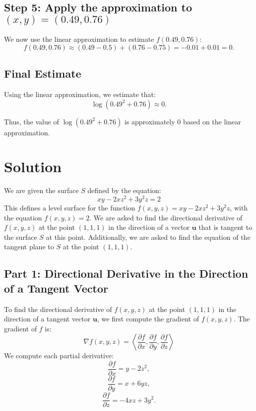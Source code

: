 \documentclass[11pt]{article}
\begin{document}
\newpage

\subsection{Step 5: Apply the approximation to \( (x, y) = (0.49, 0.76) \)}

We now use the linear approximation to estimate \( f(0.49, 0.76) \):
\[
f(0.49, 0.76) \approx (0.49 - 0.5) + (0.76 - 0.75) = -0.01 + 0.01 = 0.
\]

\newpage

\subsection{Final Estimate}

Using the linear approximation, we estimate that:
\[
\log(0.49^2 + 0.76) \approx 0.
\]

Thus, the value of \( \log(0.49^2 + 0.76) \) is approximately 0 based on the linear approximation.





\newpage

\section{Solution}

We are given the surface \( S \) defined by the equation:
\[
xy - 2xz^2 + 3y^2z = 2
\]
This defines a level surface for the function \( f(x, y, z) = xy - 2xz^2 + 3y^2z \), with the equation \( f(x, y, z) = 2 \). We are asked to find the directional derivative of \( f(x, y, z) \) at the point \( (1, 1, 1) \) in the direction of a vector \( \mathbf{u} \) that is tangent to the surface \( S \) at this point. Additionally, we are asked to find the equation of the tangent plane to \( S \) at the point \( (1, 1, 1) \).

\subsection{Part 1: Directional Derivative in the Direction of a Tangent Vector}

To find the directional derivative of \( f(x, y, z) \) at the point \( (1, 1, 1) \) in the direction of a tangent vector \( \mathbf{u} \), we first compute the gradient of \( f(x, y, z) \). The gradient of \( f \) is:
\[
\nabla f(x, y, z) = \left\langle \frac{\partial f}{\partial x}, \frac{\partial f}{\partial y}, \frac{\partial f}{\partial z} \right\rangle
\]
We compute each partial derivative:
\[
\frac{\partial f}{\partial x} = y - 2z^2,
\]
\[
\frac{\partial f}{\partial y} = x + 6yz,
\]
\[
\frac{\partial f}{\partial z} = -4xz + 3y^2.
\]
\end{document}
